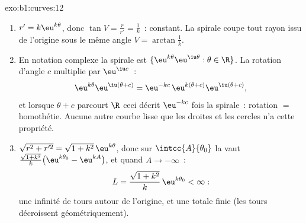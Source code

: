 \begin{solution}{exo:b1:curves:12}
\begin{enumerate}
  \item $r' = k\eu^{k\theta}$, donc $\tan V = \frac{r}{r'} =
        \frac1k$~: constant. La spirale coupe tout rayon issu de
        l'origine sous le même angle $V = \arctan\frac1k$.
  \item En notation complexe la spirale est $\{\eu^{k\theta}
        \eu^{\iu\theta} : \theta \in \R\}$. La rotation d'angle $c$
        multiplie par $\eu^{\iu c}$~:
        \[
        \eu^{k\theta}\eu^{\iu(\theta + c)}
        = \eu^{-kc}\,\eu^{k(\theta + c)}\eu^{\iu(\theta+c)} ,
        \]
        et lorsque $\theta + c$ parcourt $\R$ ceci décrit
        $\eu^{-kc}$ fois la spirale~: rotation $=$ homothétie. Aucune
        autre courbe lisse que les droites et les cercles n'a cette
        propriété.
  \item $\sqrt{r^2 + r'^2} = \sqrt{1 + k^2}\,\eu^{k\theta}$, donc
        sur $\intcc{A}{\theta_0}$ la  vaut
        $\frac{\sqrt{1+k^2}}{k}\bigl(\eu^{k\theta_0} -
        \eu^{kA}\bigr)$, et quand $A \to -\infty$~:
        \[
        L = \frac{\sqrt{1 + k^2}}{k}\,\eu^{k\theta_0} < \infty :
        \]
        une infinité de tours autour de l'origine, et une  totale
        finie (les tours décroissent géométriquement).
\end{enumerate}
\end{solution}

